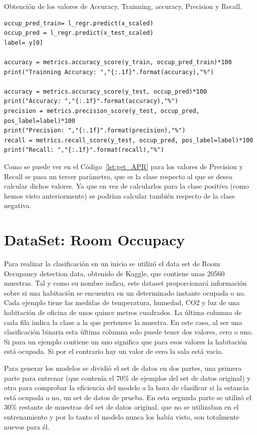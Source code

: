 \documentclass[a4paper, 12pt]{book}
\begin{document}
\begin{listing}[]
    \caption{Obtención de los valores de Accuracy, Trainning, accuracy, Precision y Recall.}{}
    \label{lst:get_APR}
    \begin{verbatim}
occup_pred_train= l_regr.predict(x_scaled)
occup_pred = l_regr.predict(x_test_scaled)    
label= y[0]

accuracy = metrics.accuracy_score(y_train, occup_pred_train)*100
print("Trainning Accuracy: ","{:.1f}".format(accuracy),"%")

accuracy = metrics.accuracy_score(y_test, occup_pred)*100
print("Accuracy: ","{:.1f}".format(accuracy),"%")
precision = metrics.precision_score(y_test, occup_pred, pos_label=label)*100
print("Precision: ","{:.1f}".format(precision),"%")
recall = metrics.recall_score(y_test, occup_pred, pos_label=label)*100
print("Recall: ","{:.1f}".format(recall),"%")
    \end{verbatim}
\end{listing}

Como se puede ver en el Código~\ref{lst:get_APR} para los valores de Precision y Recall se pasa un tercer parámetro, que es la clase respecto al que se desea calcular dichos valores. Ya que en vez de calcularlos para la clase positiva (como hemos visto anteriormente) se podrían calcular también respecto de la clase negativa.

\section{DataSet: Room Occupacy}
\label{sec:dataSet_Occupancy}

Para realizar la clasificación en un inicio se utilizó el data set de Room Occupancy detection data\cite{DataSetOccupancy}, obtenido de Kaggle, que contiene unas 20560 muestras. Tal y como su nombre indica, este dataset proporcionará información sobre si una habitación se encuentra en un determinado instante ocupada o no. Cada ejemplo tiene las medidas de temperatura, humedad, CO2 y luz de una habitación de oficina de unos quince metros cuadrados. La última columna de cada fila indica la clase a la que pertenece la muestra. En este caso, al ser una clasificación binaria esta última columna solo puede tener dos valores, cero o uno. Si para un ejemplo contiene un uno significa que para esos valores la habitación está ocupada. Si por el contrario hay un valor de cero la sala está vacia. 

Para generar los modelos se dividió el set de datos en dos partes, una primera parte para entrenar (que contenía el 70\% de ejemplos del set de datos original) y otra para comprobar la eficiencia del modelo a la hora de clasificar si la estancia está ocupada o no, un set de datos de prueba. En esta segunda parte se utilizó el 30\% restante de muestras del set de datos original, que no se utilizaban en el entrenamiento y por lo tanto el modelo nunca los había visto, son totalmente nuevos para él.
\end{document}

